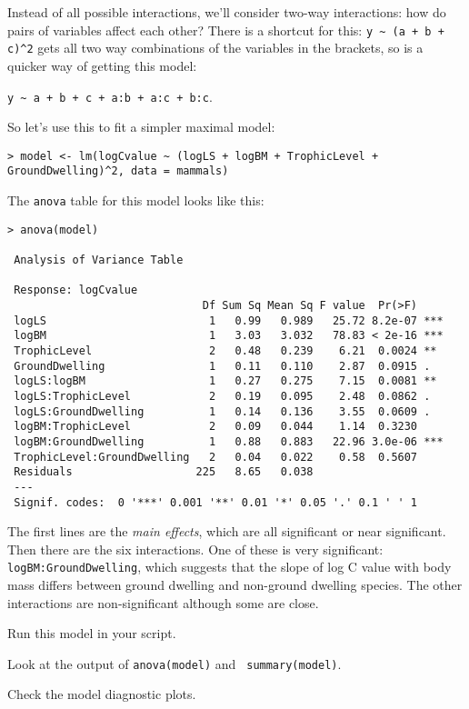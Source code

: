 Instead of all possible interactions, we'll consider two-way 
interactions: how do pairs of variables affect each other? There is a 
shortcut for this: {\tt y \textasciitilde{} (a + b + 
c)\textasciicircum{}2} gets all two way combinations of the variables 
in the brackets, so is a quicker way of getting this model:

{\tt y \textasciitilde{} a + b + c + a:b + a:c + b:c}.

So let's use this to fit a simpler maximal model:

\begin{lstlisting}
> model <- lm(logCvalue ~ (logLS + logBM + TrophicLevel + GroundDwelling)^2, data = mammals)
\end{lstlisting}

The {\tt anova} table for this model looks like this:

\begin{lstlisting}
> anova(model)

 Analysis of Variance Table
 
 Response: logCvalue
                              Df Sum Sq Mean Sq F value  Pr(>F)    
 logLS                         1   0.99   0.989   25.72 8.2e-07 ***
 logBM                         1   3.03   3.032   78.83 < 2e-16 ***
 TrophicLevel                  2   0.48   0.239    6.21  0.0024 ** 
 GroundDwelling                1   0.11   0.110    2.87  0.0915 .  
 logLS:logBM                   1   0.27   0.275    7.15  0.0081 ** 
 logLS:TrophicLevel            2   0.19   0.095    2.48  0.0862 .  
 logLS:GroundDwelling          1   0.14   0.136    3.55  0.0609 .  
 logBM:TrophicLevel            2   0.09   0.044    1.14  0.3230    
 logBM:GroundDwelling          1   0.88   0.883   22.96 3.0e-06 ***
 TrophicLevel:GroundDwelling   2   0.04   0.022    0.58  0.5607    
 Residuals                   225   8.65   0.038                    
 ---
 Signif. codes:  0 '***' 0.001 '**' 0.01 '*' 0.05 '.' 0.1 ' ' 1 
\end{lstlisting}

The first lines are the {\it main effects}, which are all significant 
or near significant. Then there are the six interactions. One of these 
is very significant: {\tt logBM:GroundDwelling}, which suggests that 
the slope of log C value with body mass differs between ground dwelling 
and non-ground dwelling species. The other interactions are 
non-significant although some are close. 

\begin{compactitem}[$\quad\star$]
	\item Run this model in your script.
	\item Look at the output of {\tt anova(model)} and {\tt 
	summary(model)}.
	\item Check the model diagnostic plots.
\end{compactitem}

